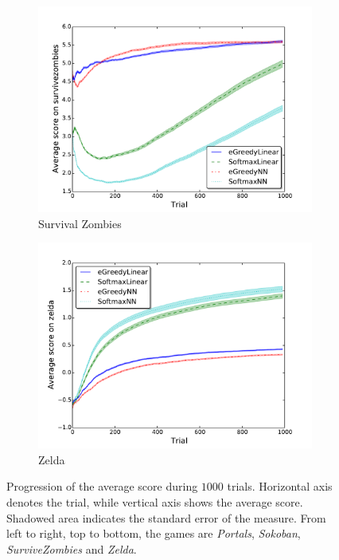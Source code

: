 \documentclass[conference]{IEEEtran}
\begin{document}
\begin{figure}[!t]
\begin{center}
\begin{subfigure} {\lefig\textwidth}
	\includegraphics[width = \textwidth]{img/survivezombies_scores}
  \caption{Survival Zombies}
\end{subfigure}\begin{subfigure} {\lefig\textwidth}
	\includegraphics[width = \textwidth]{img/zelda_scores}
  \caption{Zelda}
\end{subfigure}

	\caption{Progression of the average score during $1000$ trials. Horizontal axis denotes the trial, while vertical axis shows the average score. Shadowed area indicates the standard error of the measure. From left to right, top to bottom, the games are \textit{Portals}, \textit{Sokoban}, \textit{SurviveZombies} and \textit{Zelda}.}
	\label{fig:results2}
	\end{center}
\end{figure}
\end{document}
